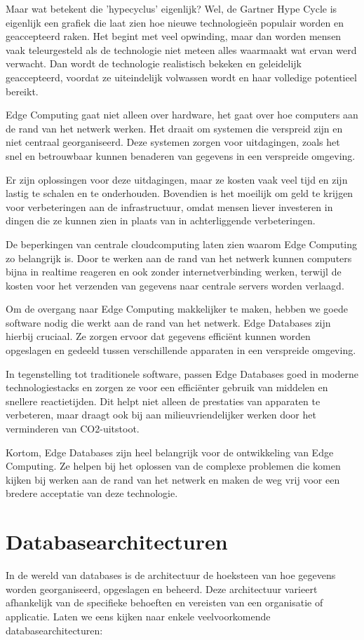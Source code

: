 Maar wat betekent die 'hypecyclus' eigenlijk? Wel, de Gartner Hype Cycle is eigenlijk een grafiek die laat zien hoe nieuwe technologieën populair worden en geaccepteerd raken. Het begint met veel opwinding, maar dan worden mensen vaak teleurgesteld als de technologie niet meteen alles waarmaakt wat ervan werd verwacht. Dan wordt de technologie realistisch bekeken en geleidelijk geaccepteerd, voordat ze uiteindelijk volwassen wordt en haar volledige potentieel bereikt.

Edge Computing gaat niet alleen over hardware, het gaat over hoe computers aan de rand van het netwerk werken. Het draait om systemen die verspreid zijn en niet centraal georganiseerd. Deze systemen zorgen voor uitdagingen, zoals het snel en betrouwbaar kunnen benaderen van gegevens in een verspreide omgeving.

Er zijn oplossingen voor deze uitdagingen, maar ze kosten vaak veel tijd en zijn lastig te schalen en te onderhouden. Bovendien is het moeilijk om geld te krijgen voor verbeteringen aan de infrastructuur, omdat mensen liever investeren in dingen die ze kunnen zien in plaats van in achterliggende verbeteringen.

De beperkingen van centrale cloudcomputing laten zien waarom Edge Computing zo belangrijk is. Door te werken aan de rand van het netwerk kunnen computers bijna in realtime reageren en ook zonder internetverbinding werken, terwijl de kosten voor het verzenden van gegevens naar centrale servers worden verlaagd.

Om de overgang naar Edge Computing makkelijker te maken, hebben we goede software nodig die werkt aan de rand van het netwerk. Edge Databases zijn hierbij cruciaal. Ze zorgen ervoor dat gegevens efficiënt kunnen worden opgeslagen en gedeeld tussen verschillende apparaten in een verspreide omgeving.

In tegenstelling tot traditionele software, passen Edge Databases goed in moderne technologiestacks en zorgen ze voor een efficiënter gebruik van middelen en snellere reactietijden. Dit helpt niet alleen de prestaties van apparaten te verbeteren, maar draagt ook bij aan milieuvriendelijker werken door het verminderen van CO2-uitstoot.

Kortom, Edge Databases zijn heel belangrijk voor de ontwikkeling van Edge Computing. Ze helpen bij het oplossen van de complexe problemen die komen kijken bij werken aan de rand van het netwerk en maken de weg vrij voor een bredere acceptatie van deze technologie.

\section{Databasearchitecturen}
In de wereld van databases is de architectuur de hoeksteen van hoe gegevens worden georganiseerd, opgeslagen en beheerd. Deze architectuur varieert afhankelijk van de specifieke behoeften en vereisten van een organisatie of applicatie. Laten we eens kijken naar enkele veelvoorkomende databasearchitecturen:

